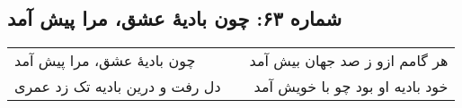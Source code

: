 \begin{center}
\section*{شماره ۶۳: چون بادیۀ عشق، مرا پیش آمد}
\label{sec:063}
\begin{longtable}{l p{0.5cm} r}
چون بادیهٔ عشق، مرا پیش آمد
&&
هر گامم ازو ز صد جهان بیش آمد
\\
دل رفت و درین بادیه تک زد عمری
&&
خود بادیه او بود چو با خویش آمد
\\
\end{longtable}
\end{center}
